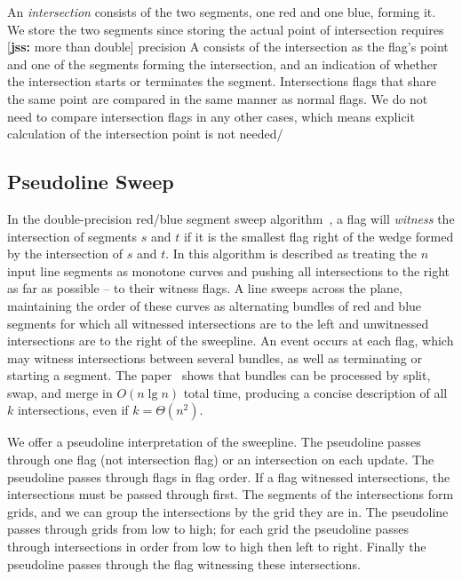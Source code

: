 \documentclass[11pt]{article}
\def\sm#1{{\footnotesize [{\bf jss:} #1]}}
\begin{document}
An \textit{intersection} consists of the two segments, one red and one blue, forming it.
We store the two segments since storing the actual point of intersection requires \sm{more than double} precision
A  consists of the intersection as the flag's point and one of the segments forming the intersection, and an indication of whether the intersection starts or terminates the segment.
Intersections flags that share the same point are compared in the same manner as normal flags.
We do not need to compare intersection flags in any other cases, which means explicit calculation of the intersection point is not needed/


\subsection{Pseudoline Sweep}\label{{sec psweep}}
In the double-precision red/blue segment sweep algorithm~\cite{MS}, a flag will \textit{witness} the intersection of segments $s$ and $t$ if it is the smallest flag right of the wedge formed by the intersection of $s$ and $t$.
In \cite{MS} this algorithm is described as treating the $n$ input line segments as monotone curves and pushing all intersections to the right as far as possible -- to their witness flags.
A line sweeps across the plane, maintaining the order of these curves as alternating bundles of red and blue segments for which all witnessed intersections are to the left and unwitnessed intersections are to the right of the sweepline. 
An event occurs at each flag, which may witness intersections between several bundles, as well as terminating or starting a segment.  
The paper~\cite{MS} shows that bundles can be processed by split, swap, and merge in $O(n\lg n)$ total time, producing a concise description of all $k$ intersections, even if $k=\Theta(n^2)$.

We offer a pseudoline interpretation of the sweepline.
The pseudoline passes through one flag (not intersection flag) or an intersection on each update.
The pseudoline passes through flags in flag order.
If a flag witnessed intersections, the intersections must be passed through first.
The segments of the intersections form grids, and we can group the intersections by the grid they are in.
The pseudoline passes through grids from low to high; for each grid the pseudoline passes through intersections in order from low to high then left to right.
Finally the pseudoline passes through the flag witnessing these intersections.
\end{document}

